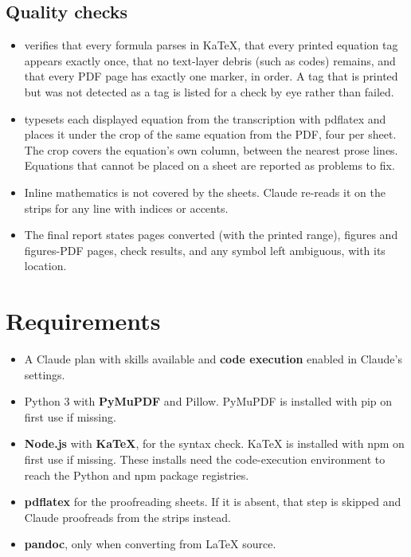 \documentclass[11pt,a4paper]{article}
\begin{document}
\subsection{Quality checks}\label{sec:checks}
\begin{itemize}
\item {} verifies that every formula parses in KaTeX, that every printed equation
  tag appears exactly once, that no text-layer debris (such as  codes) remains,
  and that every PDF page has exactly one marker, in order. A tag that is printed but was
  not detected as a tag is listed for a check by eye rather than failed.
\item {} typesets each displayed equation from the transcription with
  pdflatex and places it under the crop of the same equation from the PDF, four per sheet.
  The crop covers the equation's own column, between the nearest prose lines.
  Equations that cannot be placed on a sheet are reported as problems to fix.
\item Inline mathematics is not covered by the sheets. Claude re-reads it on the strips for
  any line with indices or accents.
\item The final report states pages converted (with the printed range), figures and
  figures-PDF pages, check results, and any symbol left ambiguous, with its location.
\end{itemize}

\section{Requirements}
\begin{itemize}
\item A Claude plan with skills available and \textbf{code execution} enabled in Claude's settings.
\item Python 3 with \textbf{PyMuPDF} and Pillow. PyMuPDF is installed with pip on first use if missing.
\item \textbf{Node.js} with \textbf{KaTeX}, for the syntax check. KaTeX is installed with npm
  on first use if missing. These installs need the code-execution environment to reach the
  Python and npm package registries.
\item \textbf{pdflatex} for the proofreading sheets. If it is absent, that step is skipped and
  Claude proofreads from the strips instead.
\item \textbf{pandoc}, only when converting from LaTeX source.
\end{itemize}
\end{document}
